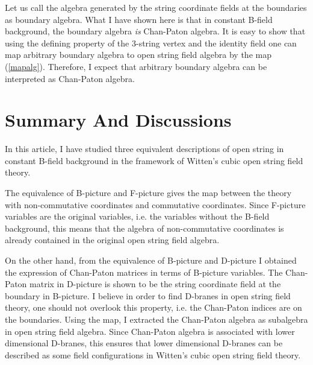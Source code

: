 \documentclass[a4paper,12pt]{article}
\begin{document}
Let us call the algebra
generated by the string coordinate fields
at the boundaries
as boundary algebra.
What I have shown here is 
that in constant
B-field background,
the boundary algebra {\em is} 
Chan-Paton algebra.
It is easy to show that
using the defining  property of
the 3-string vertex and the identity
field
one can map arbitrary boundary algebra
to open string field algebra
by the map (\ref{mapalg}).
Therefore, 
I expect that
arbitrary boundary algebra
can be interpreted as
Chan-Paton algebra.





\section{Summary And Discussions}\label{summary}
In this article, I have studied
three equivalent
descriptions of open string in constant B-field 
background
in the framework of
Witten's cubic open string field theory.

The equivalence
of B-picture and F-picture
gives the map between the theory with
non-commutative coordinates and
commutative coordinates.
Since F-picture variables
are the original variables, i.e.
the variables without the B-field background,
this means
that the algebra of non-commutative coordinates
is already contained in the
original open string field algebra.


On the other hand,
from the equivalence of
B-picture and D-picture
I obtained the expression of
Chan-Paton matrices
in terms of B-picture variables.
The Chan-Paton matrix in D-picture is
shown to be the string coordinate field
at the boundary in B-picture.
I believe  
in order to find D-branes in open string field theory,
one should not overlook this property, i.e.
the Chan-Paton indices are on the boundaries.
Using the map,
I extracted
the Chan-Paton algebra
as subalgebra in
open string field algebra. 
Since Chan-Paton algebra is
associated with 
lower dimensional D-branes,
this ensures that lower dimensional 
D-branes can be described
as some
field configurations
in Witten's cubic open string field theory.
\end{document}
